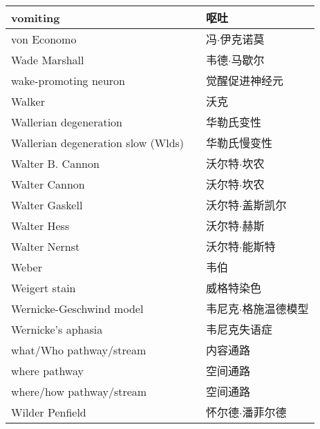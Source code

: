 \begin{longtable}{lll}
	\midrule
	vomiting  && 呕吐  \\
	
	\midrule
	von Economo   && 冯$\cdot$伊克诺莫  \\
	
	\midrule
	Wade Marshall  && 韦德$\cdot$马歇尔  \\
	
	\midrule
	wake-promoting neuron  && 觉醒促进神经元  \\
	
	\midrule
	Walker  && 沃克  \\
	
	\midrule
	Wallerian degeneration  && 华勒氏变性  \\
	
	\midrule
	Wallerian degeneration slow (Wlds) && 华勒氏慢变性  \\
	
	\midrule
	Walter B. Cannon  && 沃尔特$\cdot$坎农  \\
	
	\midrule
	Walter Cannon  && 沃尔特$\cdot$坎农  \\
	
	\midrule
	Walter Gaskell  && 沃尔特$\cdot$盖斯凯尔  \\
	
	\midrule
	Walter Hess  && 沃尔特$\cdot$赫斯  \\
	
	\midrule
	Walter Nernst  && 沃尔特$\cdot$能斯特  \\
	
	\midrule
	Weber  && 韦伯  \\
	
	\midrule
	Weigert stain  && 威格特染色  \\
	
	\midrule
	Wernicke-Geschwind model  && 韦尼克$\cdot$格施温德模型  \\
	
	\midrule
	Wernicke's aphasia  && 韦尼克失语症  \\
	
	\midrule
	what/Who pathway/stream  && 内容通路  \\
	
	\midrule
	where pathway && 空间通路  \\
	
	\midrule
	where/how pathway/stream && 空间通路  \\
	
	\midrule
	Wilder Penfield && 怀尔德$\cdot$潘菲尔德  \\
	

\end{longtable}
